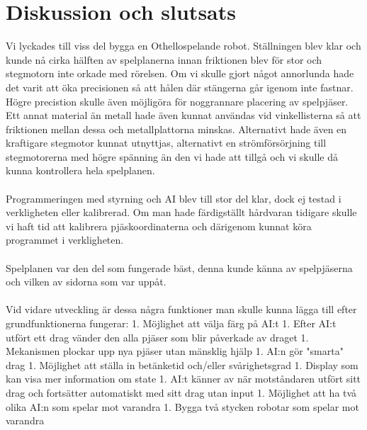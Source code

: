 \documentclass[a4paper]{article}
\begin{document}
\section{Diskussion och slutsats}
Vi lyckades till viss del bygga en Othellospelande robot. Ställningen blev klar och kunde nå cirka hälften av spelplanerna innan friktionen blev för stor och stegmotorn inte orkade med rörelsen. Om vi skulle gjort något annorlunda hade det varit att öka precisionen så att hålen där stängerna går igenom inte fastnar. Högre precistion skulle även möjligöra för noggrannare placering av spelpjäser. Ett annat material än metall hade även kunnat användas vid vinkellisterna så att friktionen mellan dessa och metallplattorna minskas. Alternativt hade även en kraftigare stegmotor kunnat utnyttjas, alternativt en strömförsörjning till stegmotorerna med högre spänning än den vi hade att tillgå och vi skulle då kunna kontrollera hela spelplanen.
\\
\\
Programmeringen med styrning och AI blev till stor del klar, dock ej testad i verkligheten eller kalibrerad. Om man hade färdigställt hårdvaran tidigare skulle vi haft tid att kalibrera pjäskoordinaterna och därigenom kunnat köra programmet i verkligheten. 
\\
\\
Spelplanen var den del som fungerade bäst, denna kunde känna av spelpjäserna och vilken av sidorna som var uppåt.
\\
\\
Vid vidare utveckling är dessa några funktioner man skulle kunna lägga till efter grundfunktionerna fungerar: 
1. Möjlighet att välja färg på AI:t
1. Efter AI:t utfört ett drag vänder den alla pjäser som blir påverkade av draget
1. Mekanismen plockar upp nya pjäser utan mänsklig hjälp
1. AI:n gör "smarta" drag
1. Möjlighet att ställa in betänketid och/eller svårighetsgrad
1. Display som kan visa mer information om state
1. AI:t känner av när motståndaren utfört sitt drag och fortsätter automatiskt med sitt drag utan input
1. Möjlighet att ha två olika AI:n som spelar mot varandra
1. Bygga två stycken robotar som spelar mot varandra
\end{document}
